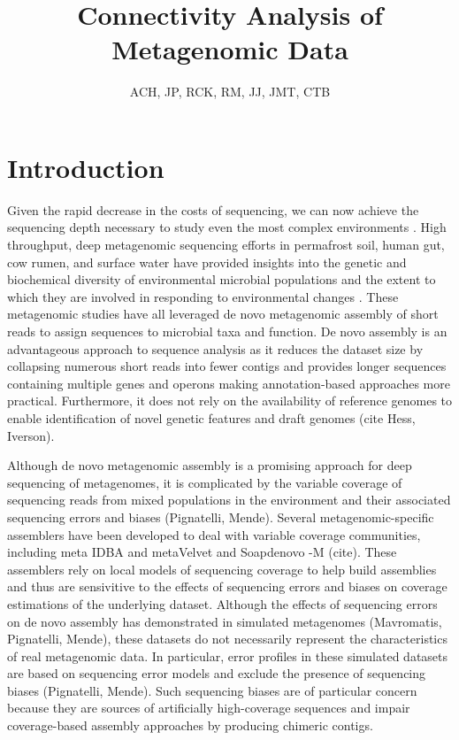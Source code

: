 \documentclass[11pt]{article} %
\begin{document}
\title{Connectivity Analysis of Metagenomic Data}
\author{ACH, JP, RCK, RM, JJ, JMT, CTB}
\maketitle

\section{Introduction}
Given the rapid decrease in the costs of sequencing, we can now achieve the sequencing depth necessary to study even the most complex environments \cite{Hess:2011p686,Qin:2010p189}.  High throughput, deep metagenomic sequencing efforts in permafrost soil, human gut, cow rumen, and surface water have provided insights into the genetic and biochemical diversity of environmental microbial populations \cite{Hess, Qin, Iverson} and the extent to which they are involved in responding to environmental changes \cite{Janet}. These metagenomic studies have all leveraged de novo metagenomic assembly of short reads to assign sequences to microbial taxa and function.  De novo assembly is an advantageous approach to sequence analysis as it reduces the dataset size by collapsing numerous short reads into fewer contigs and provides longer sequences containing multiple genes and operons \cite{Miller:2010p226,Pop:2009p798} making annotation-based approaches more practical.  Furthermore, it does not rely on the availability of reference genomes to enable identification of novel genetic features and draft genomes (cite Hess, Iverson).

Although de novo metagenomic assembly is a promising approach for deep sequencing of metagenomes, it is complicated by the variable coverage of sequencing reads from mixed populations in the environment and their associated sequencing errors and biases (Pignatelli, Mende).  Several metagenomic-specific assemblers have been developed to deal with variable coverage communities, including meta IDBA and metaVelvet and Soapdenovo -M (cite).  These assemblers rely on local models of sequencing coverage to help build assemblies and thus are sensivitive to the effects of sequencing errors and biases on coverage estimations of the underlying dataset. Although the effects of sequencing errors on de novo assembly has  demonstrated in simulated metagenomes (Mavromatis, Pignatelli, Mende), these datasets do not necessarily represent the characteristics of real metagenomic data.  In particular, error profiles in these simulated datasets are based on sequencing error models and exclude the presence of sequencing biases (Pignatelli, Mende).  Such sequencing biases are of particular concern because they are sources of artificially high-coverage sequences and impair coverage-based assembly approaches by producing chimeric contigs.
\end{document}

